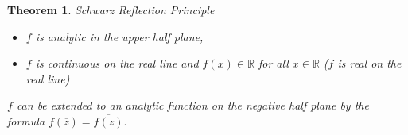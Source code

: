 \documentclass[12pt]{Qual}
\newtheorem{theorem}{Theorem}
\begin{document}
\vspace{0.25cm}
\begin{theorem}{\Large\textit{Schwarz Reflection Principle}}

\vspace{-0.25cm}
\begin{itemize}[leftmargin=2.5cm]
\setlength\itemsep{-0.1em}
\renewcommand\labelitemi{\faPuzzlePiece}
    \item $f$ is analytic in the upper half plane,
    \item $f$ is continuous on the real line and $f(x)\in\mathbb{R}$ for all $x\in\mathbb{R}$ ($f$ is real on the real line)
\end{itemize}

 \begin{minipage}{0.85\textwidth}
\vspace{0.45cm}
$f$ can be extended to an analytic function on the negative half plane by the formula $f(\overline{z})=\overline{f(z)}.$
\end{minipage}



\end{theorem}
\newpage
\end{document}
